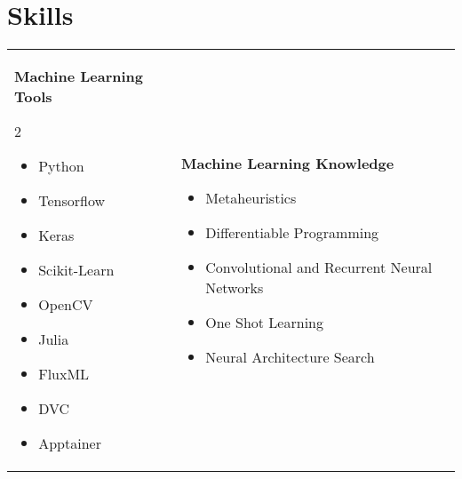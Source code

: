 \documentclass[12pt, letterpaper]{article}
\renewcommand{\large}{\fontsize{14}{20}\selectfont}
\begin{document}
	\section{Skills}
	\begin{tabular}[t]{ l l }
		\parbox[l]{0.5\linewidth}{
			{\large \color{base-color} \textbf{Machine Learning Tools}}
			\begin{multicols}{2}
			\begin{itemize}[leftmargin=*]
				\setlength\itemsep{0.05em}
				\item[] Python
				\item[] Tensorflow
				\item[] Keras
				\item[] Scikit-Learn
				\item[] OpenCV
				\item[] Julia
				\item[] FluxML
				\item[] DVC
				\item[] Apptainer
			\end{itemize}
			\end{multicols}
		}&
		\parbox{0.5\textwidth}{
			{\large \color{base-color} \textbf{Machine Learning Knowledge}}
			\begin{itemize}[leftmargin=*]
				\setlength\itemsep{0.05em}
				\item[] Metaheuristics
				\item[] Differentiable Programming
				\item[] Convolutional and Recurrent Neural Networks
				\item[] One Shot Learning
				\item[] Neural Architecture Search
			\end{itemize}
		}\medskip \\


\end{tabular}
\end{document}
